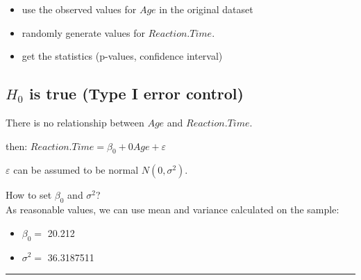 \documentclass[]{article}
\newenvironment{Shaded}{\begin{snugshade}}{\end{snugshade}}
\newcommand{\KeywordTok}[1]{\textcolor[rgb]{0.13,0.29,0.53}{\textbf{#1}}}
\newcommand{\CommentTok}[1]{\textcolor[rgb]{0.56,0.35,0.01}{\textit{#1}}}
\newcommand{\OperatorTok}[1]{\textcolor[rgb]{0.81,0.36,0.00}{\textbf{#1}}}
\newcommand{\NormalTok}[1]{#1}
\providecommand{\tightlist}{%
  \setlength{\itemsep}{0pt}\setlength{\parskip}{0pt}}
\begin{document}
\begin{itemize}
\tightlist
\item
  use the observed values for \(Age\) in the original dataset\\
\item
  randomly generate values for \(Reaction.Time\).
\item
  get the statistics (p-values, confidence interval)
\end{itemize}

\subsection{\texorpdfstring{\(H_0\) is true (Type I error
control)}{H\_0 is true (Type I error control)}}\label{h_0-is-true-type-i-error-control}

There is no relationship between \(Age\) and \(Reaction.Time\).

then: \(Reaction.Time=\beta_0 + 0 Age + \varepsilon\)

\(\varepsilon\) can be assumed to be normal \(N(0,\sigma^2)\).

How to set \(\beta_0\) and \(\sigma^2\)?\\
As reasonable values, we can use mean and variance calculated on the
sample:

\begin{Shaded}
\end{Shaded}

\begin{itemize}
\tightlist
\item
  \(\beta_0=\) 20.212
\item
  \(\sigma^2=\) 36.3187511
\end{itemize}

\begin{center}\rule{0.5\linewidth}{\linethickness}\end{center}

\begin{Shaded}
\end{Shaded}
\end{document}

